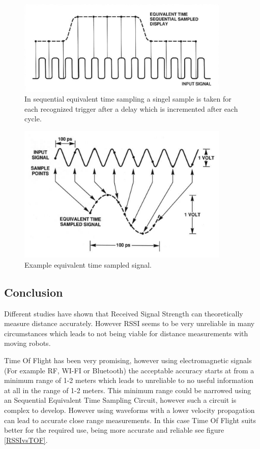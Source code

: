 \documentclass[10pt,a4paper]{article}
\begin{document}
\begin{figure}[H]
\centering
\includegraphics[width=0.9\textwidth]{SETS.png}
\caption{In sequential equivalent time sampling a singel sample is taken for each recognized trigger after a delay which is incremented after each cycle.\cite{SETS}} 
\label{SETS}
\end{figure}

\begin{figure}[H]
\centering
\includegraphics[width=0.9\textwidth]{SETS2.png}
\caption{Example equivalent time sampled signal.\cite{SETS}} 
\label{SETS2}
\end{figure}
\newpage

\subsection{Conclusion}
Different studies have shown that Received Signal Strength can theoretically measure distance accurately. However RSSI seems to be very unreliable in many circumstances which leads to not being viable for distance measurements with moving robots. 

Time Of Flight has been very promising, however using electromagnetic signals (For example RF, WI-FI or Bluetooth) the acceptable accuracy starts at from a minimum range of 1-2 meters which leads to unreliable to no useful information at all in the range of 1-2 meters. This minimum range could be narrowed using an Sequential Equivalent Time Sampling Circuit, however such a circuit is complex to develop. However using waveforms with a lower velocity propagation can lead to accurate close range measurements. In this case Time Of Flight suits better for the required use, being more accurate and reliable see figure \ref{RSSIvsTOF}.\cite{TOF}
\end{document}
